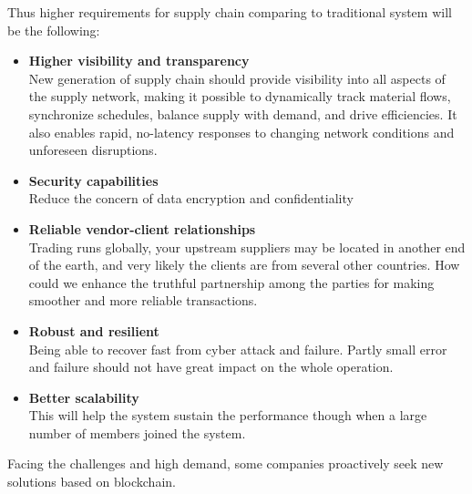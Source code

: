 Thus higher requirements for supply chain comparing to traditional system will be the following:
\begin{itemize}
	\item \textbf{Higher visibility and transparency}\\
	New generation of supply chain should provide visibility
	into all aspects of the supply network, making
	it possible to dynamically track material flows,	
	synchronize schedules, balance supply with
	demand, and drive efficiencies. It also enables
	rapid, no-latency responses to changing network
	conditions and unforeseen disruptions.
	\item \textbf{Security capabilities} \\Reduce the concern of data encryption and confidentiality
	\item \textbf{Reliable vendor-client relationships}\\ Trading runs globally, your upstream suppliers may be located in another end of the earth, and very likely the clients are from several other countries. How could we enhance the truthful partnership among the parties for making smoother and more reliable transactions.
	
	\item \textbf{Robust and resilient} \\
	Being able to recover fast from cyber attack and failure. Partly small error and failure should not have great impact on the whole operation.
	\item \textbf{Better scalability}\\ This will help the system sustain the performance though when a large number of members joined the system.
\end{itemize} 
Facing the challenges and high demand, some companies proactively seek new solutions based on blockchain.  	



